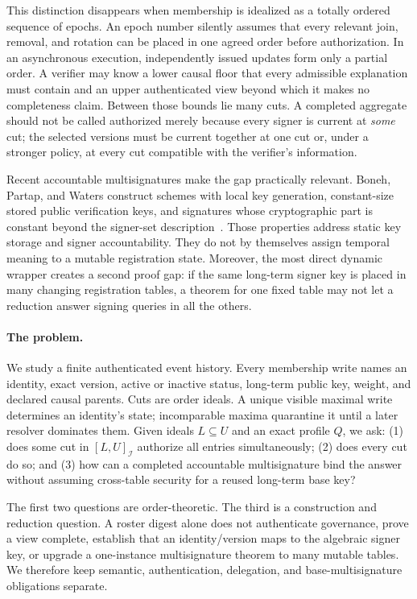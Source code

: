 \documentclass[11pt]{article}
\theoremstyle{definition}
\newcommand{\Id}{\mathcal I}
\begin{document}
This distinction disappears when membership is idealized as a totally ordered sequence of epochs.  An epoch number silently assumes that every relevant join, removal, and rotation can be placed in one agreed order before authorization.  In an asynchronous execution, independently issued updates form only a partial order.  A verifier may know a lower causal floor that every admissible explanation must contain and an upper authenticated view beyond which it makes no completeness claim.  Between those bounds lie many cuts.  A completed aggregate should not be called authorized merely because every signer is current at \emph{some} cut; the selected versions must be current together at one cut or, under a stronger policy, at every cut compatible with the verifier's information.

Recent accountable multisignatures make the gap practically relevant.  Boneh, Partap, and Waters construct schemes with local key generation, constant-size stored public verification keys, and signatures whose cryptographic part is constant beyond the signer-set description~\cite{boneh2025accountable}.  Those properties address static key storage and signer accountability.  They do not by themselves assign temporal meaning to a mutable registration state.  Moreover, the most direct dynamic wrapper creates a second proof gap: if the same long-term signer key is placed in many changing registration tables, a theorem for one fixed table may not let a reduction answer signing queries in all the others.

\paragraph{The problem.}
We study a finite authenticated event history.  Every membership write names an identity, exact version, active or inactive status, long-term public key, weight, and declared causal parents.  Cuts are order ideals.  A unique visible maximal write determines an identity's state; incomparable maxima quarantine it until a later resolver dominates them.  Given ideals $L\subseteq U$ and an exact profile $Q$, we ask: (1) does some cut in $[L,U]_{\Id}$ authorize all entries simultaneously; (2) does every cut do so; and (3) how can a completed accountable multisignature bind the answer without assuming cross-table security for a reused long-term base key?

The first two questions are order-theoretic.  The third is a construction and reduction question.  A roster digest alone does not authenticate governance, prove a view complete, establish that an identity/version maps to the algebraic signer key, or upgrade a one-instance multisignature theorem to many mutable tables.  We therefore keep semantic, authentication, delegation, and base-multisignature obligations separate.
\end{document}
